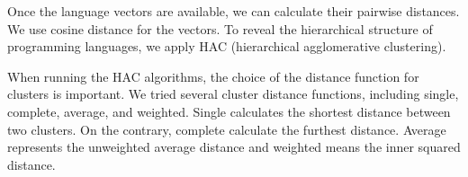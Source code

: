 \documentclass[12pt,oneside,final]{vlsithesis}
\begin{document}
\begin{table*}
	\caption{Repository-repository-matrix transform toLanguage-repository Matrix}
	\label{tab:Repository-repository-matrix transform to Language-repository Matrix}
\end{table*}

Once the language vectors are available, we can calculate their pairwise distances. We use cosine distance for the vectors. To reveal the hierarchical structure of programming languages, we apply HAC (hierarchical agglomerative clustering).

When running the HAC algorithms, the choice of the distance function for clusters is important. We tried several cluster distance functions, including single, complete, average, and weighted.  Single calculates the shortest distance between two clusters. On the contrary, complete calculate the furthest distance. Average represents the unweighted average distance and weighted means the inner squared distance. 
\end{document}
